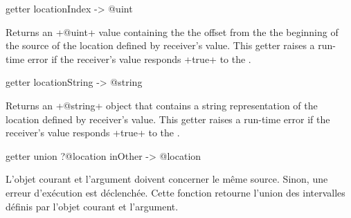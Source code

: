 \begin{galgas}
getter locationIndex -> @uint
\end{galgas}

Returns an \ggs+@uint+ value containing the the offset from the the beginning of the source of the location defined by receiver's value. This getter raises a run-time error if the receiver's value responds \ggs+true+ to the .



\begin{galgas}
getter locationString -> @string
\end{galgas}

Returns an \ggs+@string+ object that contains a string representation of the location defined by receiver's value. This getter raises a run-time error if the receiver's value responds \ggs+true+ to the .



\begin{galgas}
getter union ?@location inOther -> @location
\end{galgas}

L'objet courant et l'argument doivent concerner le même source. Sinon, une erreur d'exécution est déclenchée. Cette fonction retourne l'union des intervalles définis par l'objet courant et l'argument. 

